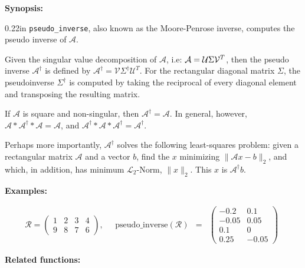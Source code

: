 {\bf Synopsis:} %

\begin{addtolength}{\leftskip}{0.22in}
\texttt{pseudo\_inverse}, also known as the Moore-Penrose inverse, computes
the pseudo inverse of $\mathcal{A}$. 

Given the singular value decomposition of $\mathcal{A}$, i.e: $\mathcal{A} = 
{\cal U} 
\Sigma{\cal V}^T$, then the pseudo inverse $\mathcal{A}^{\dagger}$ is defined 
by $\mathcal{A}^{\dagger} = \mathcal{V} \Sigma^{\dagger} \mathcal{U}^{T}$. For the 
rectangular diagonal
matrix $\Sigma$, the pseudoinverse $\Sigma^{\dagger}$ is computed by taking the reciprocal
of every diagonal element and transposing the resulting matrix.

If $\mathcal{A}$ is square and non-singular, then $\mathcal{A}^{\dagger} = \mathcal{A}$.
In general, however,
$\mathcal{A} * \mathcal{A}^{\dagger} * \mathcal{A} = \mathcal{A}$, and
$\mathcal{A}^{\dagger} *  \mathcal{A} * \mathcal{A}^{\dagger} = \mathcal{A}^{\dagger}$.

Perhaps more importantly, $\mathcal{A}^{\dagger}$ solves the following least-squares
problem: given a rectangular matrix $\mathcal{A}$ and a vector $b$, find the
$x$ minimizing $\|\mathcal{A}x - b\|_2$, 
and which, in addition, has minimum $\mathcal{L}_{2}$-Norm, $\|x\|_2$.  
This $x$ is $\mathcal{A}^{\dagger} b$.

\end{addtolength}

{\bf Examples:}
\nopagebreak
\begin{flushleft}
\begin{displaymath}
\mathcal{R} = \left( \begin{array}{cccc} 1 & 2 & 3 & 4 \\ 9 & 8 & 7 & 6
\end{array} \right),
\quad
\begin{array}{ccc}
\text{pseudo\_inverse}(\mathcal{R}) & = & 
        \left( \begin{array}{cc} -0.2 & 0.1 \\ -0.05 & 0.05 \\ 0.1 & 0 
\\ 0.25 & -0.05 
 \end{array} \right) 
\end{array}
\end{displaymath}  
\end{flushleft}

{\bf Related functions:}


